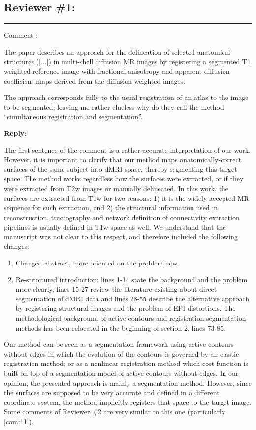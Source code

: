 \documentclass[9pt]{memoir}
\newcounter{reviewpoint}
\newenvironment{reviewpoint}%
{\refstepcounter{reviewpoint}\par\medskip\vspace{3ex}\hrule\vspace{1.5ex}\par\noindent%
   {\fontseries{b}\selectfont Comment \arabic{reviewpoint}:}
   \begingroup%
   \color{black!60}
   \fontshape{it}\selectfont %

}
{\endgroup\label{com:\thereviewpoint}\par\medskip}
\newcommand{\reply}{\par\fontshape{n}\selectfont \noindent \textbf{Reply}:\ }
\begin{document}
\subsection*{Reviewer \#1:}
\begin{reviewpoint}
The paper describes an approach for the delineation of selected anatomical structures ([...]) in multi-shell diffusion MR images
  by registering a segmented T1 weighted reference image with fractional anisotropy and apparent diffusion coefficient maps derived
  from the diffusion weighted images.

The approach corresponds fully to the usual registration of an atlas to the image to be segmented, leaving me rather clueless why do
  they call the method ``simultaneous registration and segmentation''.

\end{reviewpoint}
\reply{
The first sentence of the comment is a rather accurate interpretation of our work.
However, it is important to clarify that our method maps anatomically-correct surfaces of the same subject into dMRI space,
  thereby segmenting this target space.
The method works regardless how the surfaces were extracted, or if they were extracted from T2w images or manually delineated.
In this work, the surfaces are extracted from T1w for two reasons: 1) it is the widely-accepted MR sequence for such extraction,
  and 2) the structural information used in reconstruction, tractography and network definition of connectivity extraction pipelines
  is usually defined in T1w-space as well.
We understand that the manuscript was not clear to this respect, and therefore included the following changes:
\begin{enumerate}
\item Changed abstract, more oriented on the problem now.
\item Re-structured introduction: lines 1-14 state the background and the problem more clearly, lines 15-27 review
  the literature existing about direct segmentation of dMRI data and lines 28-55 describe the alternative approach
  by registering structural images and the problem of EPI distortions.
  The methodological background of active-contours and registration-segmentation methods has been relocated in
    the beginning of section 2, lines 73-85.
\end{enumerate}

Our method can be seen as a segmentation framework using active contours without edges in which the evolution
  of the contours is governed by an elastic registration method;
or as a nonlinear registration method which cost function is built on top of a segmentation model of active contours
  without edges.
In our opinion, the presented approach is mainly a segmentation method.
However, since the surfaces are supposed to be very accurate and defined in a different coordinate system,
  the method implicitly registers that space to the target image.
Some comments of Reviewer \#2 are very similar to this one (particularly \autoref{com:11}).
}
\end{document}
